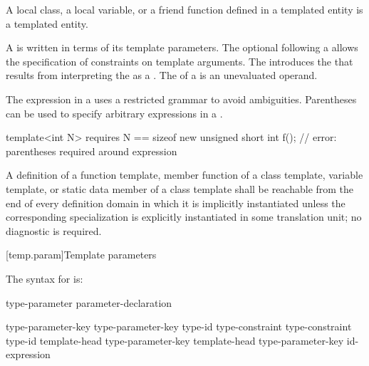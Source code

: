 \begin{note}
A local class, a local variable, or a friend function defined in a
templated entity is a templated entity.
\end{note}

\pnum
A  is written
in terms of its template parameters.
The optional  following a
 allows the specification of
constraints on template arguments.
The  introduces the
 that results from interpreting
the  as a
.
The  of a
 is an unevaluated operand.
\begin{note}
The expression in a 
uses a restricted grammar to avoid ambiguities.
Parentheses can be used to specify arbitrary expressions
in a .
\begin{example}
\begin{codeblock}
template<int N> requires N == sizeof new unsigned short
int f();            // error: parentheses required around \tcode{==} expression
\end{codeblock}
\end{example}
\end{note}

\pnum
A definition of
a function template,
member function of a class template,
variable template,
or static data member of a class template
shall be reachable from the end of every definition domain
in which it is implicitly instantiated unless the
corresponding specialization is explicitly instantiated
in some translation unit; no diagnostic is required.

[temp.param]{Template parameters}

\pnum
The syntax for
is:

\begin{bnf}
\br
  type-parameter\br
  parameter-declaration
\end{bnf}

\begin{bnf}
\br
  type-parameter-key  \br
  type-parameter-key  \terminal{=} type-id\br
  type-constraint  \br
  type-constraint  \terminal{=} type-id\br
  template-head type-parameter-key  \br
  template-head type-parameter-key  \terminal{=} id-expression
\end{bnf}

